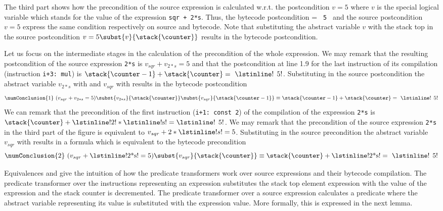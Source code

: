 The third part shows how the precondition of the source expression is calculated w.r.t. the postcondition $v = 5$ where 
$v$ is the special logical variable which stands for the value of the expression \lstinline!sqr + 2*s!.
Thus, the bytecode postcondition \stack{\counter} = \lstinline! 5 ! and the source postcondition $v = 5$ express the same condition
respectively on source and bytecode.
Note that  substituting the abstract variable $v$ with the stack top in the source postcondition $ v = 5\subst{v}{\stack{\counter}}$ 
results in the bytecode postcondition.

 Let us focus on the intermediate stages in the calculation of the precondition of the whole expression.
We may  remark that the resulting 
postcondition   of the source expression   \lstinline!2*s! is $v_{sqr} +v_{2*s}=5$ and that the postcondition at line 1.9
for the last instruction of its compilation (instruction \lstinline!i+3: mul!) is $\stack{\counter - 1}  + \stack{\counter} =~\mbox{\rm \lstinline! 5!}  $.
Substituting in the source postcondition the abstract variable $v_{2*s}$ with \stack{\counter} and $v_{sqr}$  with  results
in the bytecode postcondition
 $$ \numConclusion{1} \ (v_{sqr} +v_{2*s}=5)  \subst{v_{2*s}}{\stack{\counter}}\subst{v_{sqr}}{\stack{\counter-1}} \equiv\stack{\counter - 1}  + \stack{\counter} =~\mbox{\rm \lstinline! 5!} $$
We can remark that the precondition of  the first instruction (\lstinline!i+1: const 2!)
of the compilation of the expression \lstinline!2*s! is   $\stack{\counter} + \mbox{\rm \lstinline!2!}*\mbox{\rm \lstinline!s!} = \mbox{\rm \lstinline! 5!}$. 
We may remark that the  precondition of the source expression \lstinline!2*s!  in the third part of the figure is equivalent to $v_{sqr} + 2*\lstinline!s!=5 $.
Substituting in the source precondition the abstract variable $v_{sqr}$ with \stack{\counter} results
in a formula which is equivalent to the bytecode precondition
 $$\numConclusion{2} \ (v_{sqr} +\mbox{\rm \lstinline!2*s!} =5) \subst{v_{sqr}}{\stack{\counter}} \equiv \stack{\counter }  + \mbox{\rm \lstinline!2*s!}  = ~\mbox{\rm \lstinline! 5!} $$

Equivalences   and  give the intuition of how the predicate transformers work over  source expressions and 
their bytecode compilation. The predicate transformer over the instructions representing an expression
 substitutes the stack top element expression  \stack{\counter} with the value of the expression and the stack counter is decremented. The predicate transformer 
over a source expression calculates a predicate where the abstract variable representing its value is substituted with the expression value. 
More formally, this is expressed in the next lemma.  

